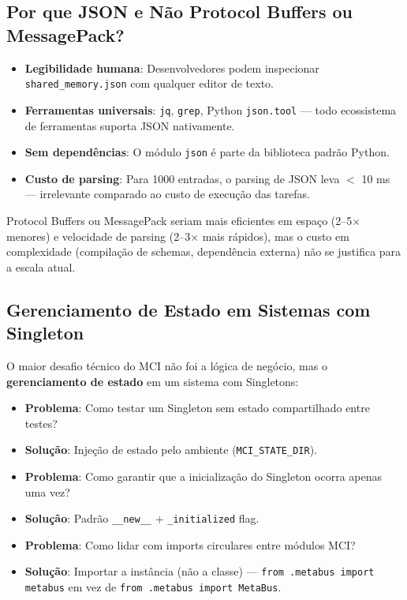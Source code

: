 \subsection{Por que JSON e Não Protocol Buffers ou MessagePack?}

\begin{itemize}
    \item \textbf{Legibilidade humana}: Desenvolvedores podem inspecionar \texttt{shared\_memory.json} com qualquer editor de texto.
    \item \textbf{Ferramentas universais}: \texttt{jq}, \texttt{grep}, Python \texttt{json.tool} — todo ecossistema de ferramentas suporta JSON nativamente.
    \item \textbf{Sem dependências}: O módulo \texttt{json} é parte da biblioteca padrão Python.
    \item \textbf{Custo de parsing}: Para 1000 entradas, o parsing de JSON leva $<$ 10 ms — irrelevante comparado ao custo de execução das tarefas.
\end{itemize}

Protocol Buffers ou MessagePack seriam mais eficientes em espaço (2--5× menores) e velocidade de parsing (2--3× mais rápidos), mas o custo em complexidade (compilação de schemas, dependência externa) não se justifica para a escala atual.

\subsection{Gerenciamento de Estado em Sistemas com Singleton}

O maior desafio técnico do MCI não foi a lógica de negócio, mas o \textbf{gerenciamento de estado} em um sistema com Singletons:

\begin{itemize}
    \item \textbf{Problema}: Como testar um Singleton sem estado compartilhado entre testes?
    \item \textbf{Solução}: Injeção de estado pelo ambiente (\texttt{MCI\_STATE\_DIR}).
    
    \item \textbf{Problema}: Como garantir que a inicialização do Singleton ocorra apenas uma vez?
    \item \textbf{Solução}: Padrão \texttt{\_\_new\_\_} + \texttt{\_initialized} flag.
    
    \item \textbf{Problema}: Como lidar com imports circulares entre módulos MCI?
    \item \textbf{Solução}: Importar a instância (não a classe) — \texttt{from .metabus import metabus} em vez de \texttt{from .metabus import MetaBus}.
\end{itemize}

